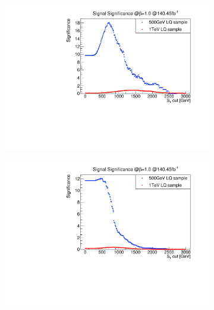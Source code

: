 \begin{figure}
  \centering
                \begin{subfigure}[t]{0.49\textwidth}
                \includegraphics[width=\textwidth]{figures/plots/Significance/xcut_2b-jet_1tau.pdf}
                \label{xcut:ST:2b1tau}
                \end{subfigure}
                \begin{subfigure}[t]{0.49\textwidth}
                \includegraphics[width=\textwidth]{figures/plots/Significance/xcut_2b-jet_2tau.pdf}
                \label{xcut:ST:2b2tau}

\end{subfigure}
\end{figure}

